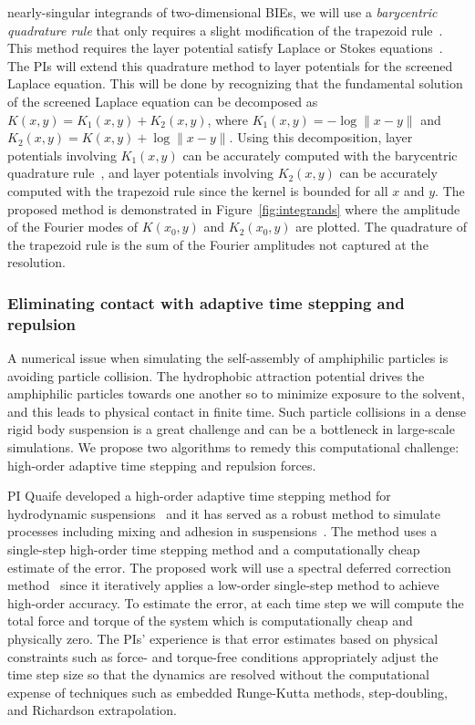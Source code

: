 nearly-singular integrands of two-dimensional BIEs, we will use a {\em
barycentric quadrature rule} that only requires a slight modification of
the trapezoid rule~\cite{ioa-pap-per1991}. This method requires the
layer potential satisfy Laplace or Stokes
equations~\cite{bar-wu-vee2015, chi-moo-qua2020}. The PIs will extend
this quadrature method to layer potentials for the screened Laplace
equation. This will be done by recognizing that the fundamental solution
of the screened Laplace equation can be decomposed as $K(x,y) = K_1(x,y)
+ K_2(x,y)$, where $K_1(x,y) = -\log\|x - y\|$ and $K_2(x,y) = K(x,y) +
\log\|x - y\|$. Using this decomposition, layer potentials involving
$K_1(x,y)$ can be accurately computed with the barycentric quadrature
rule~\cite{ioa-pap-per1991}, and layer potentials involving $K_2(x,y)$
can be accurately computed with the trapezoid rule since the kernel is
bounded for all $x$ and $y$. The proposed method is demonstrated in
Figure~\ref{fig:integrands} where the amplitude of the Fourier modes of
$K(x_0,y)$ and $K_2(x_0,y)$ are plotted. The quadrature of the trapezoid
rule is the sum of the Fourier amplitudes not captured at the
resolution.


\subsubsection{Eliminating contact with adaptive time stepping and
repulsion}
\label{subsec:timeStepping}

A numerical issue when simulating the self-assembly of amphiphilic
particles is avoiding particle collision. The hydrophobic attraction
potential drives the amphiphilic particles towards one another so to
minimize exposure to the solvent, and this leads to physical contact in
finite time. Such particle collisions in a dense rigid body suspension
is a great challenge and can be a bottleneck in large-scale simulations.
We propose two algorithms to remedy this computational challenge:
high-order adaptive time stepping and repulsion forces.

PI Quaife developed a high-order adaptive time stepping method for
hydrodynamic suspensions~\cite{qua-bir2016} and it has served as a
robust method to simulate processes including mixing and adhesion in
suspensions~\cite{qua-vee-you2019, kab-qua-bir2017}. The method uses
a single-step high-order time stepping method and a computationally
cheap estimate of the error. The proposed work will use a spectral
deferred correction method~\cite{dut-gre-rok2000} since it iteratively
applies a low-order single-step method to achieve high-order accuracy.
To estimate the error, at each time step we will compute the total force
and torque of the system which is computationally cheap and physically
zero. The PIs' experience is that error estimates based on physical
constraints such as force- and torque-free conditions appropriately
adjust the time step size so that the dynamics are resolved without the
computational expense of techniques such as embedded Runge-Kutta
methods, step-doubling, and Richardson extrapolation.

